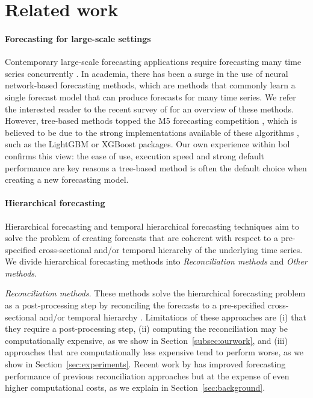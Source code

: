 \documentclass[preprint, 3p, times, twocolumn]{elsarticle}
\begin{document}
\section{Related work} \label{sec:relwork}

\paragraph{Forecasting for large-scale settings} Contemporary large-scale forecasting applications require forecasting many time series concurrently \cite{bose_probabilistic_2017}. In academia, there has been a surge in the use of neural network-based forecasting methods, which are methods that commonly learn a single forecast model that can produce forecasts for many time series. We refer the interested reader to the recent survey of \citet{benidis_deep_2023} for an overview of these methods. However, tree-based methods topped the M5 forecasting competition \cite{makridakis_m5_2022}, which is believed to be due to the strong implementations available of these algorithms \cite{januschowski_forecasting_2022}, such as the LightGBM \cite{ke_lightgbm_2017} or XGBoost \cite{chen_xgboost_2016} packages. Our own experience within bol confirms this view: the ease of use, execution speed and strong default performance are key reasons a tree-based method is often the default choice when creating a new forecasting model.

\paragraph{Hierarchical forecasting} Hierarchical forecasting \cite{hyndman_optimal_2011, hyndman_fast_2016, taieb_coherent_2017, bentaieb_regularized_2019, wickramasuriya_optimal_2019} and temporal hierarchical forecasting techniques \cite{taieb_sparse_2017,athanasopoulos_forecasting_2017,rangapuram_coherent_2023,theodosiou_forecasting_2021} aim to solve the problem of creating forecasts that are coherent with respect to a pre-specified cross-sectional and/or temporal hierarchy of the underlying time series. We divide hierarchical forecasting methods into \textit{Reconciliation methods} and \textit{Other methods}.

\textit{Reconciliation methods}. These methods solve the hierarchical forecasting problem as a post-processing step by reconciling the forecasts to a pre-specified cross-sectional and/or temporal hierarchy \cite{hyndman_optimal_2011, hyndman_fast_2016, taieb_coherent_2017, bentaieb_regularized_2019, wickramasuriya_optimal_2019, panagiotelis_forecast_2021, girolimetto_point_2023}. Limitations of these approaches are (i) that they require a post-processing step, (ii) computing the reconciliation may be computationally expensive, as we show in Section~\ref{subsec:ourwork}, and (iii) approaches that are computationally less expensive tend to perform worse, as we show in Section~\ref{sec:experiments}. Recent work by \citet{taieb_sparse_2017, bentaieb_regularized_2019} has improved forecasting performance of previous reconciliation approaches but at the expense of even higher computational costs, as we explain in Section~\ref{sec:background}.
\end{document}
